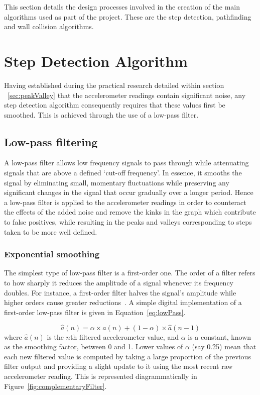 \documentclass[12pt,a4paper]{report}
\begin{document}
This section details the design processes involved in the creation of the main algorithms used as part of the project. These are the step detection, pathfinding and wall collision algorithms.

\section{Step Detection Algorithm}
Having established during the practical research detailed within section ~\ref{sec:peakValley} that the accelerometer readings contain significant noise, any step detection algorithm consequently requires that these values first be smoothed. This is achieved through the use of a low-pass filter.

\subsection{Low-pass filtering}

A low-pass filter allows low frequency signals to pass through while attenuating signals that are above a defined `cut-off frequency'. In essence, it smooths the signal by eliminating small, momentary fluctuations while preserving any significant changes in the signal that occur gradually over a longer period. Hence a low-pass filter is applied to the accelerometer readings in order to counteract the effects of the added noise and remove the kinks in the graph which contribute to false positives, while resulting in the peaks and valleys corresponding to steps taken to be more well defined. 

\subsubsection{Exponential smoothing}

The simplest type of low-pass filter is a first-order one. The order of a filter refers to how sharply it reduces the amplitude of a signal whenever its frequency doubles. For instance, a first-order filter halves the signal's amplitude while higher orders cause greater reductions~\cite[p.2528]{casiez20121}. A simple digital implementation of a first-order low-pass filter is given in Equation~\ref{eq:lowPass}.   

\begin{equation}\label{eq:lowPass}
\hat{a}(n) = \alpha \times a(n) + (1 - \alpha) \times \hat{a}(n-1)
\end{equation}
where $\hat{a}(n)$ is the $n$th filtered accelerometer value, and $\alpha$ is a constant, known as the smoothing factor, between 0 and 1. Lower values of $\alpha$ (say 0.25) mean that each new filtered value is computed by taking a large proportion of the previous filter output and providing a slight update to it using the most recent raw accelerometer reading. This is represented diagrammatically in Figure~\ref{fig:complementaryFilter}.  
\end{document}
